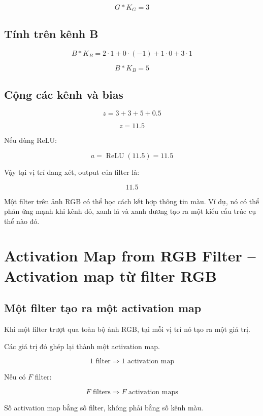 \[
G*K_G=3
\]

\subsection{Tính trên kênh B}

\[
B*K_B
=
2\cdot1+0\cdot(-1)+1\cdot0+3\cdot1
\]

\[
B*K_B=5
\]

\subsection{Cộng các kênh và bias}

\[
z
=
3+3+5+0.5
\]

\[
z=11.5
\]

Nếu dùng ReLU:

\[
a=\operatorname{ReLU}(11.5)=11.5
\]

Vậy tại vị trí đang xét, output của filter là:

\[
11.5
\]

\begin{vidu}
Một filter trên ảnh RGB có thể học cách kết hợp thông tin màu. Ví dụ, nó có thể phản ứng mạnh khi kênh đỏ, xanh lá và xanh dương tạo ra một kiểu cấu trúc cụ thể nào đó.
\end{vidu}

\section{Activation Map from RGB Filter -- Activation map từ filter RGB}

\subsection{Một filter tạo ra một activation map}

Khi một filter trượt qua toàn bộ ảnh RGB, tại mỗi vị trí nó tạo ra một giá trị.

Các giá trị đó ghép lại thành một activation map.

\[
    1 \text{ filter}
    \Rightarrow
    1 \text{ activation map}
\]

Nếu có $F$ filter:

\[
    F \text{ filters}
    \Rightarrow
    F \text{ activation maps}
\]

\begin{ghinho}
Số activation map bằng số filter, không phải bằng số kênh màu.
\end{ghinho}

